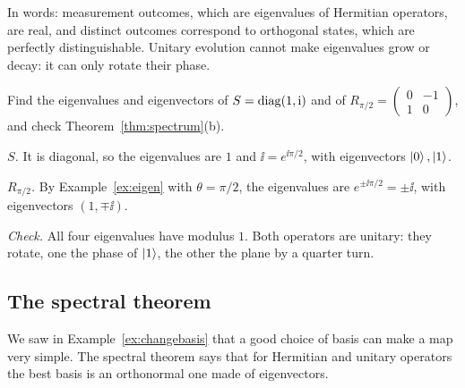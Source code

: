 In words: measurement outcomes, which are eigenvalues of Hermitian operators, are real, and distinct outcomes correspond to orthogonal states, which are perfectly distinguishable. Unitary evolution cannot make eigenvalues grow or decay: it can only rotate their phase.

\begin{example}\label{ex:unitary-eig}
  Find the eigenvalues and eigenvectors of $S=\operatorname{diag}(1,\mathrm{i})$ and of $R_{\pi/2}=\begin{pmatrix}0&-1\\1&0\end{pmatrix}$, and check Theorem~\ref{thm:spectrum}(b).
\end{example}
\begin{solution}
  \begin{steps}
    \item \emph{$S$.} It is diagonal, so the eigenvalues are $1$ and $\ii=e^{\ii\pi/2}$, with eigenvectors $\left|0\right\rangle,\left|1\right\rangle$.
    \item \emph{$R_{\pi/2}$.} By Example~\ref{ex:eigen} with $\theta=\pi/2$, the eigenvalues are $e^{\pm\ii\pi/2}=\pm\ii$, with eigenvectors $(1,\mp\ii)$.
    \item \emph{Check.} All four eigenvalues have modulus $1$. Both operators are unitary: they rotate, one the phase of $\left|1\right\rangle$, the other the plane by a quarter turn.
  \end{steps}
\end{solution}

\subsection{The spectral theorem}

We saw in Example~\ref{ex:changebasis} that a good choice of basis can make a map very simple. The spectral theorem says that for Hermitian and unitary operators the best basis is an orthonormal one made of eigenvectors.

